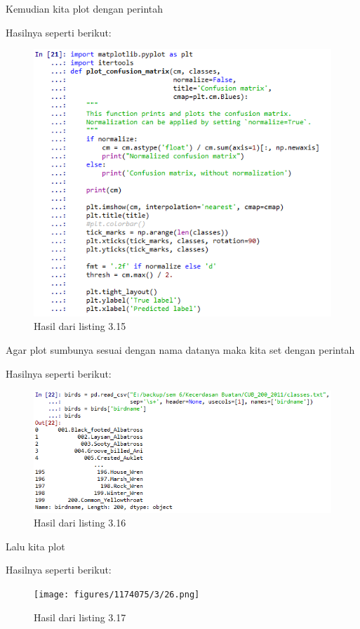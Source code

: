 Kemudian kita plot dengan perintah

Hasilnya seperti berikut:
\begin{figure}[H]
	\centering
	\includegraphics[width=12cm]{figures/1174075/3/24.png}
	\caption{Hasil dari listing 3.15}
\end{figure}

Agar plot sumbunya sesuai dengan nama datanya maka kita set dengan perintah

Hasilnya seperti berikut:
\begin{figure}[H]
	\centering
	\includegraphics[width=12cm]{figures/1174075/3/25.png}
	\caption{Hasil dari listing 3.16}
\end{figure}

Lalu kita plot

Hasilnya seperti berikut:
\begin{figure}[H]
	\centering
	\texttt{[image: figures/1174075/3/26.png]}
	\caption{Hasil dari listing 3.17}
\end{figure}

